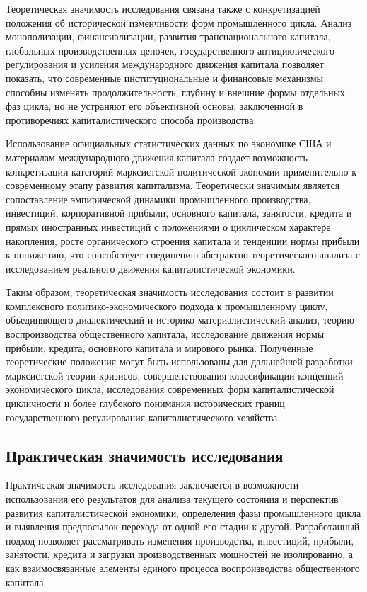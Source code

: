 Теоретическая значимость исследования связана также с конкретизацией положения об исторической изменчивости форм промышленного цикла. Анализ монополизации, финансиализации, развития транснационального капитала, глобальных производственных цепочек, государственного антициклического регулирования и усиления международного движения капитала позволяет показать, что современные институциональные и финансовые механизмы способны изменять продолжительность, глубину и внешние формы отдельных фаз цикла, но не устраняют его объективной основы, заключенной в противоречиях капиталистического способа производства.

Использование официальных статистических данных по экономике США и материалам международного движения капитала создает возможность конкретизации категорий марксистской политической экономии применительно к современному этапу развития капитализма. Теоретически значимым является сопоставление эмпирической динамики промышленного производства, инвестиций, корпоративной прибыли, основного капитала, занятости, кредита и прямых иностранных инвестиций с положениями о циклическом характере накопления, росте органического строения капитала и тенденции нормы прибыли к понижению, что способствует соединению абстрактно-теоретического анализа с исследованием реального движения капиталистической экономики.

Таким образом, теоретическая значимость исследования состоит в развитии комплексного политико-экономического подхода к промышленному циклу, объединяющего диалектический и историко-материалистический анализ, теорию воспроизводства общественного капитала, исследование движения нормы прибыли, кредита, основного капитала и мирового рынка. Полученные теоретические положения могут быть использованы для дальнейшей разработки марксистской теории кризисов, совершенствования классификации концепций экономического цикла, исследования современных форм капиталистической цикличности и более глубокого понимания исторических границ государственного регулирования капиталистического хозяйства.

\subsection*{Практическая значимость исследования}
Практическая значимость исследования заключается в возможности использования его результатов для анализа текущего состояния и перспектив развития капиталистической экономики, определения фазы промышленного цикла и выявления предпосылок перехода от одной его стадии к другой. Разработанный подход позволяет рассматривать изменения производства, инвестиций, прибыли, занятости, кредита и загрузки производственных мощностей не изолированно, а как взаимосвязанные элементы единого процесса воспроизводства общественного капитала.

